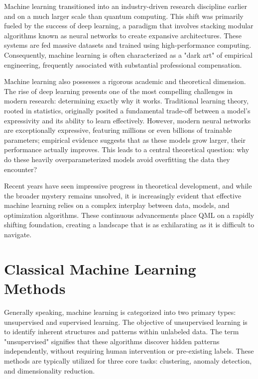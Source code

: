 \documentclass[en]{dimscthesis}
\begin{document}
Machine learning transitioned into an industry-driven research discipline earlier and on a much larger scale than quantum computing. This shift was primarily fueled by the success of deep learning, a paradigm that involves stacking modular algorithms known as neural networks to create expansive architectures. These systems are fed massive datasets and trained using high-performance computing. Consequently, machine learning is often characterized as a "dark art" of empirical engineering, frequently associated with substantial professional compensation.

Machine learning also possesses a rigorous academic and theoretical dimension. The rise of deep learning presents one of the most compelling challenges in modern research: determining exactly why it works. Traditional learning theory, rooted in statistics, originally posited a fundamental trade-off between a model's expressivity and its ability to learn effectively. However, modern neural networks are exceptionally expressive, featuring millions or even billions of trainable parameters; empirical evidence suggests that as these models grow larger, their performance actually improves. This leads to a central theoretical question: why do these heavily overparameterized models avoid overfitting the data they encounter?

Recent years have seen impressive progress in theoretical development, and while the broader mystery remains unsolved, it is increasingly evident that effective machine learning relies on a complex interplay between data, models, and optimization algorithms. These continuous advancements place QML on a rapidly shifting foundation, creating a landscape that is as exhilarating as it is difficult to navigate.

\section{Classical Machine Learning Methods} \label{clml}

Generally speaking, machine learning is categorized into two primary types: unsupervised and supervised learning. The objective of unsupervised learning is to identify inherent structures and patterns within unlabeled data. The term "unsupervised" signifies that these algorithms discover hidden patterns independently, without requiring human intervention or pre-existing labels. These methods are typically utilized for three core tasks: clustering, anomaly detection, and dimensionality reduction.
\end{document}
